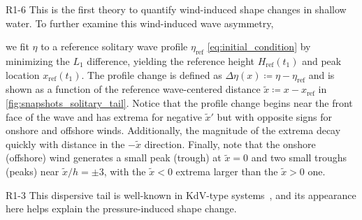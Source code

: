 \documentclass{jfm}
\begin{document}
\begin{LineLabel}{R1-6}
This is the first theory to quantify wind-induced shape changes in
shallow water.
To further examine this wind-induced wave asymmetry,
\end{LineLabel}
we fit $\eta$ to a
reference solitary wave profile $\eta_{\text{ref}}$
\cref{eq:initial_condition} by minimizing the $L_1$ difference, yielding
the reference height $H_{\text{ref}}(t_1)$ and peak location
$x_{\text{ref}}(t_1)$.
The profile change is defined as $\Delta \eta(x) \coloneqq \eta -
\eta_{\text{ref}}$ and is shown as a function of the reference
wave-centered distance $\tilde{x} \coloneqq x - x_{\text{ref}}$ in
\cref{fig:snapshots_solitary_tail}.
Notice that the profile change begins near the front face of the wave
and has extrema for negative $\tilde{x}'$ but with opposite signs for
onshore and offshore winds.
Additionally, the magnitude of the extrema decay quickly with distance
in the $-\tilde{x}$ direction.
Finally, note that the onshore (offshore) wind generates a small peak
(trough) at $\tilde{x} = 0$ and two small troughs (peaks) near
$\tilde{x}/h = \pm 3$, with the $\tilde{x}<0$ extrema larger than the
$\tilde{x}>0$ one.
\begin{LineLabel}{R1-3}
This dispersive tail is well-known in KdV-type
systems~\citep[\eg][]{hammack1974korteweg}, and its appearance here
helps explain the pressure-induced shape change.
\end{LineLabel}
\end{document}
